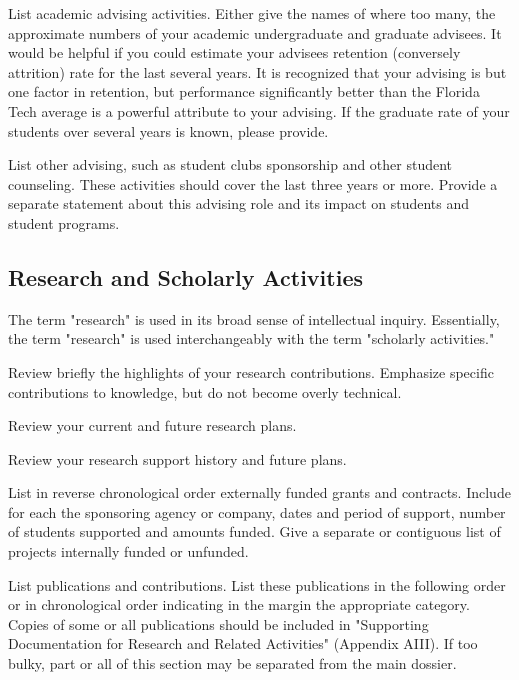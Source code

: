 List academic advising activities. Either give the names of where too many, the approximate numbers of your academic undergraduate and graduate advisees. It would be helpful if you could estimate your advisees retention (conversely attrition) rate for the last several years. It is recognized that your advising is but one factor in retention, but performance significantly better than the Florida Tech average is a powerful attribute to your advising. If the graduate rate of your students over several years is known, please provide.

List other advising, such as student clubs sponsorship and other student counseling. These activities should cover the last three years or more. Provide a separate statement about this advising role and its impact on students and student programs.

\subsection{Research and Scholarly Activities}
The term "research" is used in its broad sense of intellectual inquiry. Essentially, the term "research" is used interchangeably with the term "scholarly activities."

Review briefly the highlights of your research contributions. Emphasize specific contributions to knowledge, but do not become overly technical.

Review your current and future research plans.

Review your research support history and future plans.

List in reverse chronological order externally funded grants and contracts. Include for each the sponsoring agency or company, dates and period of support, number of students supported and amounts funded. Give a separate or contiguous list of projects internally funded or unfunded.

List publications and contributions. List these publications in the following order or in chronological order indicating in the margin the appropriate category. Copies of some or all publications should be included in "Supporting Documentation for Research and Related Activities" (Appendix AIII). If too bulky, part or all of this section may be separated from the main dossier.

